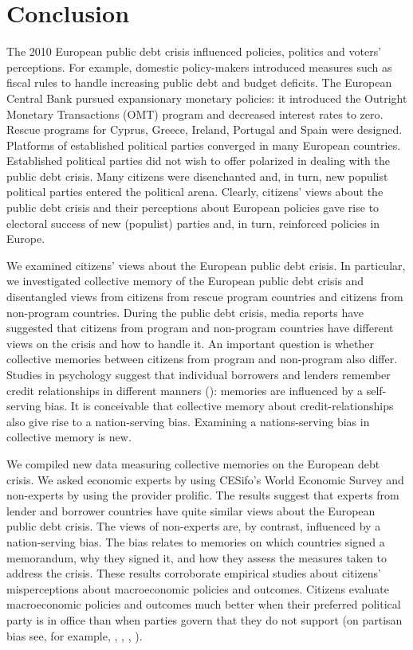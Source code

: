 \section{Conclusion} 
The 2010 European public debt crisis influenced policies, politics and voters' perceptions. For example, domestic policy-makers introduced measures such as fiscal rules to handle increasing public debt and budget deficits. The European Central Bank pursued expansionary monetary policies: it introduced the Outright Monetary Transactions (OMT) program and decreased interest rates to zero. Rescue programs for Cyprus, Greece, Ireland, Portugal and Spain were designed. Platforms of established political parties converged in many European countries. Established political parties did not wish to offer polarized in dealing with the public debt crisis. Many citizens were disenchanted and, in turn, new populist political parties entered the political arena. Clearly, citizens' views about the public debt crisis and their perceptions about European policies gave rise to electoral success of new (populist) parties and, in turn, reinforced policies in Europe. 

We examined citizens' views about the European public debt crisis. In particular, we investigated collective memory of the European public debt crisis and disentangled views from citizens from rescue program countries and citizens from non-program countries. During the public debt crisis, media reports have suggested that citizens from program and non-program countries have different views on the crisis and how to handle it. An important question is whether collective memories between citizens from program and non-program also differ. Studies in psychology suggest that individual borrowers and lenders remember credit relationships in different manners (\cite{dezso}): memories are influenced by a self-serving bias. It is conceivable that collective memory about credit-relationships also give rise to a nation-serving bias. Examining a nations-serving bias in collective memory is new.

We compiled new data measuring collective memories on the European debt crisis. We asked economic experts by using CESifo's World Economic Survey and non-experts by using the provider prolific. The results suggest that experts from lender and borrower countries have quite similar views about the European public debt crisis. The views of non-experts are, by contrast, influenced by a nation-serving bias. The bias relates to memories on which countries signed a memorandum, why they signed it, and how they assess the measures taken to address the crisis. These results corroborate empirical studies about citizens' misperceptions about macroeconomic policies and outcomes. Citizens evaluate macroeconomic policies and outcomes much better when their preferred political party is in office than when parties govern that they do not support (on partisan bias see, for example, \cite{evans}, \cite{gerber}, \cite{gillitzer}, \cite{bachmann}). 

